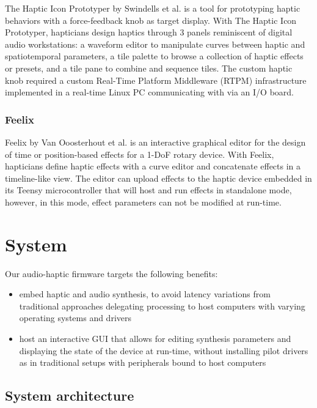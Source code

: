 \documentclass[sigconf]{nimeart}
\begin{document}
The Haptic Icon Prototyper by Swindells et al. \cite{Swindells2006role} is a tool for prototyping haptic behaviors with a force-feedback knob as target display. With The Haptic Icon Prototyper, hapticians design haptics through 3 panels reminiscent of digital audio workstations: a waveform editor to manipulate curves between haptic and spatiotemporal parameters, a tile palette to browse a collection of haptic effects or presets, and a tile pane to combine and sequence tiles. The custom haptic knob required a custom Real-Time Platform Middleware (RTPM) infrastructure implemented in a real-time Linux PC communicating with via an I/O board.

\subsubsection{Feelix}\label{feelix}

Feelix by Van Ooosterhout et al. \cite{Van2020Facilitating} is an interactive graphical editor for the design of time or position-based effects for a 1-DoF rotary device. With Feelix, hapticians define haptic effects with a curve editor and concatenate effects in a timeline-like view. The editor can upload effects to the haptic device embedded in its Teensy microcontroller \cite{Teensy} that will host and run effects in standalone mode, however, in this mode, effect parameters can not be modified at run-time.

\section{System}\label{system}

Our audio-haptic firmware targets the following benefits:

\begin{itemize}
\item
  embed haptic and audio synthesis, to avoid latency variations from traditional approaches delegating processing to host computers with varying operating systems and drivers
\item
  host an interactive GUI that allows for editing synthesis parameters and displaying the state of the device at run-time, without installing pilot drivers as in traditional setups with peripherals bound to host computers
\end{itemize}

\subsection{System architecture}\label{system-architecture}
\end{document}
